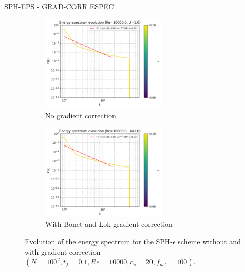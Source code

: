 SPH-EPS - GRAD-CORR ESPEC 
\begin{figure}[H]
  \begin{subfigure}{7cm}
  \centering\includegraphics[width=6cm]{Code-Figures/mon2017/grad_corr/c0_20_tait_pec_dtmul_1_mkc_no_nx_100_pst_10_re_10000_mon2017/energy_spectrum_evolution.png}
  \caption{No gradient correction}
  \end{subfigure}
  \begin{subfigure}{7cm}
  \centering\includegraphics[width=6cm]{Code-Figures/mon2017/grad_corr/c0_20_tait_pec_dtmul_1_mkc_yes_nx_100_pst_10_re_10000_mon2017/energy_spectrum_evolution.png}
  \caption{With Bonet and Lok gradient correction}
  \end{subfigure}
  \caption{Evolution of the energy spectrum for the SPH-$\epsilon$ scheme without and with gradient correction $(N=100^2, t_f=0.1, Re=10000, c_s=20, f_{pst}=100)$.}
  \label{fig:sph-eps-grad-corr-espec}
\end{figure}


